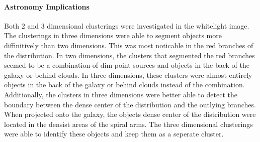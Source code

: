 \paragraph{Astronomy Implications}
Both 2 and 3 dimensional clusterings were investigated in the whitelight image. 
The clusterings in three dimensions were able to segment objects more diffinitively than two dimensions.
This was most noticable in the red branches of the distribution.
In two dimensions, the clusters that segmented the red branches seemed to be a combination of dim point sources and objects in the back of the galaxy or behind clouds.
In three dimensions, these clusters were almost entirely objects in the back of the galaxy or behind clouds instead of the combination.
Additionally, the clusters in three dimensions were better able to detect the boundary between the dense center of the distribution and the outlying branches.
When projected onto the galaxy, the objects dense center of the distribution were located in the densist areas of the spiral arms.
The three dimensional clusterings were able to identify these objects and keep them as a seperate cluster.













